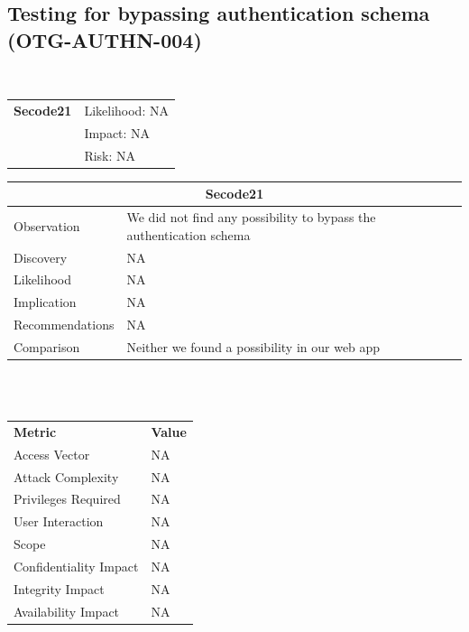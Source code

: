 \documentclass[headsepline,footsepline,footinclude=false,oneside,fontsize=11pt,paper=a4,listof=totoc,bibliography=totoc]{scrbook} %
\begin{document}
\pagebreak
\subsection{Testing for bypassing authentication schema (OTG-AUTHN-004)}\

\begin{tabular}{cR{12cm}}
	\textbf{Secode21} & Likelihood: NA\\& Impact: NA\\& Risk: NA
\end{tabular}

\begin{tabular}{ l|p{11cm}  }
	\hline
	\multicolumn{2}{c}{\textbf{Secode21}} \\
	\hline
	Observation &  We did not find any possibility to bypass the authentication schema\\
	Discovery & NA\\
	Likelihood & NA\\
	Implication & NA\\
	Recommendations & NA\\
	Comparison & Neither we found a possibility in our web app \\
	\hline
\end{tabular}
\\
\vspace{0.5cm}
\\
\begin{center}
	\begin{tabular}{ll}
		\rowcolor[HTML]{34CDF9}
		{\color[HTML]{ECF4FF} \textbf{Metric}}        & {\color[HTML]{ECF4FF} \textbf{Value}} \\
		\rowcolor[HTML]{BBDAFF}
		{\color[HTML]{333333} Access Vector}          & {\color[HTML]{333333} } NA              \\
		\rowcolor[HTML]{ECF4FF}
		{\color[HTML]{333333} Attack Complexity}      & {\color[HTML]{333333} } NA              \\
		\rowcolor[HTML]{BBDAFF}
		{\color[HTML]{333333} Privileges Required}    & {\color[HTML]{333333} } NA              \\
		\rowcolor[HTML]{ECF4FF}
		{\color[HTML]{333333} User Interaction}       & {\color[HTML]{333333} } NA              \\
		\rowcolor[HTML]{BBDAFF}
		{\color[HTML]{333333} Scope}                  & {\color[HTML]{333333} } NA              \\
		\rowcolor[HTML]{ECF4FF}
		{\color[HTML]{333333} Confidentiality Impact} & {\color[HTML]{333333} } NA              \\
		\rowcolor[HTML]{BBDAFF}
		{\color[HTML]{333333} Integrity Impact}       & {\color[HTML]{333333} } NA              \\
		\rowcolor[HTML]{ECF4FF}
		{\color[HTML]{333333} Availability Impact}    & {\color[HTML]{333333} } NA
	\end{tabular}
\end{center}
\end{document}

